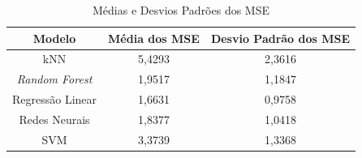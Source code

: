 \documentclass{report}
\begin{document}
\begin{table}[h!]
  \centering
  \begin{tabular}{| c | c | c |}
      \hline
      \rowcolor{lightgray}
      \textbf{Modelo} & \textbf{Média dos MSE} & \textbf{Desvio Padrão dos MSE} \\
      \hline
      kNN & 5,4293 & 2,3616 \\
      \hline
      \textit{Random Forest} & 1,9517 & 1,1847 \\
      \hline
      Regressão Linear & 1,6631 & 0,9758 \\
      \hline
      Redes Neurais & 1,8377 & 1,0418 \\
      \hline
      SVM & 3,3739 & 1,3368 \\
      \hline
  \end{tabular}
  \caption{\label{table:model_summary} Médias e Desvios Padrões dos MSE}
\end{table}
\end{document}
